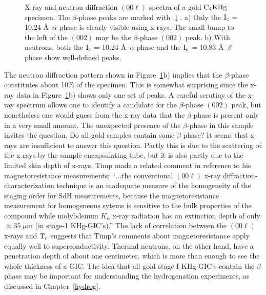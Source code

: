 \begin{figure}
\vspace{20cm}
\caption[X-ray and neutron diffraction spectra of a gold $\rm C_4KHg$
specimen.]{X-ray and neutron diffraction $(00\ell)$ spectra of  a gold $\rm
C_4KHg$  specimen.   The $\beta$-phase peaks are  marked with $\downarrow$.
a) Only the $\rm I_c$ = 10.24 \AA\ $\alpha$ phase is  clearly visible using
x-rays.  The small bump to the left of the $(002)$ may be the $\beta$-phase
$(002)$ peak.  b) With neutrons, both the $\rm  I_c$ =  10.24 \AA\ $\alpha$
phase  and  the $\rm I_c$  =  10.83 \AA\   $\beta$ phase show  well-defined
peaks.}
\label{14cneut}
\end{figure}

        The  neutron  diffraction pattern  shown in  Figure~\ref{14cneut}b)
implies that the $\beta$-phase  constitutes   about 10\% of the   specimen.
This is somewhat surprising since the x-ray  data in Figure~\ref{14cneut}b)
shows only one  set of peaks.  A   careful scrutiny of  the x-ray  spectrum
allows one to identify a candidate for the $\beta$-phase $(002)$  peak, but
nonetheless one would guess from the x-ray data  that  the $\beta$-phase is
present   only in a   very small amount.  The  unexpected  presence of  the
$\beta$-phase  in this sample invites the  question, Do   all  gold samples
contain some  $\beta$ phase?  It   seems  that  x-rays  are insufficient to
answer this question.  Partly this  is due  to the scattering of the x-rays
by the sample-encapsulating tube, but it is  also partly due to the limited
skin depth of x-rays.  Timp  made  a  related  comment  in reference to his
magnetoresistance measurements: ``$\ldots$the conventional $(00\ell)$ x-ray
diffraction-characterization technique  is  an  inadequate  measure of  the
homogeneity   of the  staging  order for    SdH  measurements, because  the
magnetoresistance measurement for  homogeneous sytems  is sensitive to  the
bulk  properties of  the   compound   while   molybdenum $K_{\alpha}$ x-ray
radiation has an extinction depth  of only  $\approx35 \: \mu$m (in stage-1
KHg-GIC's).''\cite{W179}  The  lack of  correlation between  the $(00\ell)$
x-rays and $\rm T_c$ suggests that  Timp's comments about magnetoresistance
apply equally well  to superconductivity.  Thermal neutrons,  on  the other
hand, have a penetration depth of about  one centimeter, which is more than
enough to see the  whole thickness  of a GIC.\cite{neumann88} The idea that
all gold stage I  KHg-GIC's contain the  $\beta$ phase may be important for
understanding    the     hydrogenation  experiments,     as   discussed  in
Chapter~\ref{hydrog}.

